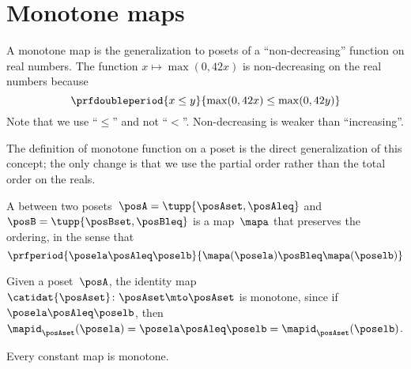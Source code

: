 
\section{Monotone maps}
\label{sec:monotonicity-monotone-maps}


A monotone map is the generalization to posets of a ``non-decreasing'' function on real numbers.
The function $x \mapsto \max(0, 42 x)$ is non-decreasing on the real numbers because
\begin{equation}
    \prfdoubleperiod{
        x \leq y
    }{
        \max(0, 42 x) \leq \max(0, 42 y)
    }
\end{equation}
Note that we use ``$\leq$'' and not ``$<$''. Non-decreasing is weaker than ``increasing''.

The definition of monotone function on a poset is the direct generalization of this concept; the only change  is that we use the partial order rather than the total order on the reals.

\begin{definition}
    \label{def:monotone}
    A \emph{} between two posets~$\posA=\tupp{\posAset, \posAleq}$ and~$\posB=\tupp{\posBset, \posBleq}$ is a map~$\mapa$ that preserves the ordering, in the sense that
    \begin{equation}
        \prfperiod{
            \posela \posAleq \poselb
        }{
            \mapa(\posela) \posBleq \mapa(\poselb)
        }
    \end{equation}
\end{definition}

\begin{example}
    Given a poset~$\posA$, the identity map~$\catidat{\posAset}\colon \posAset \mto \posAset$ is monotone, since if~$\posela\posAleq \poselb$, then~$\mapid_{\posAset}(\posela)=\posela \posAleq  \poselb =  \mapid_{\posAset}(\poselb )$.
\end{example}

\begin{example}
    Every constant map is monotone.
\end{example}


